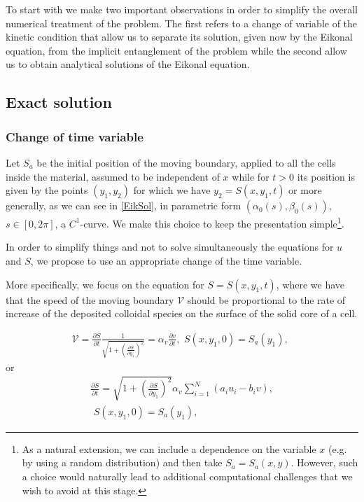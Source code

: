 \documentclass[reqno, 11pt]{amsart}
\numberwithin{equation}{section}
\begin{document}
To start with we make two important observations  in order to simplify the overall numerical treatment of the problem. The first refers to a change of variable of the kinetic condition that allow us to separate its solution, given now by the Eikonal equation, from the implicit entanglement of the problem while the second allow us to obtain  analytical solutions of the Eikonal equation.  



\subsection{Exact solution}
 \subsubsection{Change of time variable}
 Let  $S_a$ be the initial position of
 the moving boundary,  {  applied to all the cells inside the material, assumed to be independent of $x$ while} for $t>0$ its position is given by the points $(y_1, y_2)$ for which we have $y_2=S(x,y_1,t)$ or more generally, as we can see in \eqref{EikSol}, in parametric form $(\alpha_0(s), \beta_0(s))$, $s\in [0,2\pi]$, a $C^1$-curve. We make this choice to keep the presentation simple\footnote{As a natural extension, we can include a dependence on the variable $x$ (e.g. by using a random distribution) and then take $S_a=S_a(x,y)$. However, such a choice would naturally lead to additional computational challenges that we wish to avoid at this stage.}.

  In order to simplify things and not to solve simultaneously the equations for $u$ and $S$, we propose to use an appropriate change of the time variable.

More specifically, we focus on the equation for $S=S(x,y_1,t)$, where
we have that the speed of the moving boundary $\mathcal{V}$ should be proportional to the rate of increase of the deposited colloidal species on the surface of the solid core of a cell.

\begin{eqnarray*}\label{eqS10}
\mathcal{V} = \frac{\partial S}{\partial t}\frac{1}{ \sqrt{1+ \left(\frac{\partial S}{\partial y_1}\right)^2}} =
\alpha_v \frac{\partial v}{\partial t},
 \,\, S(x,y_1,0)=S_a(y_1), \,\, 
\end{eqnarray*}
or
\begin{eqnarray}\label{eqS1}
\frac{\partial S}{\partial t} =
 \sqrt{1+ \left(\frac{\partial S}{\partial y_1}\right)^2}\alpha_v \sum_{i=1}^N\left(a_iu_i- b_iv\right),\\
\label{eqSa1}
 \,\, S(x,y_1,0)=S_a(y_1), \,\, 
\end{eqnarray}
\end{document}
